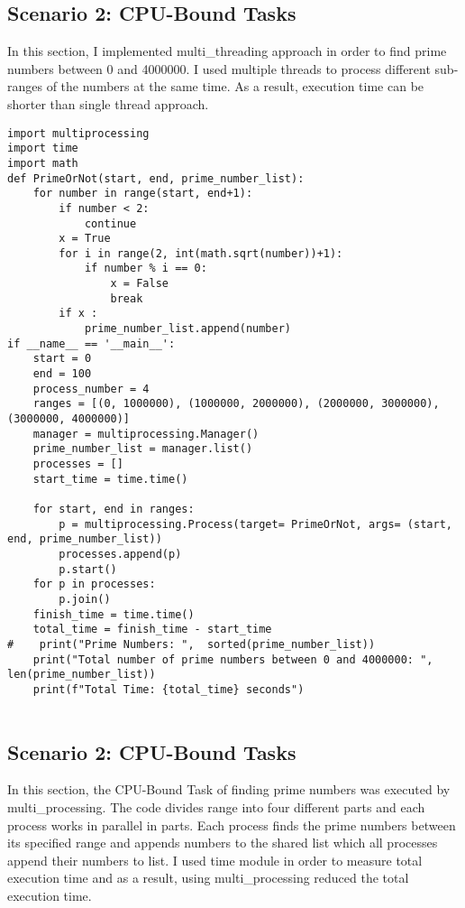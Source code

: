 \documentclass[onecolumn]{article}
\begin{document}
\subsection{Scenario 2: CPU-Bound Tasks}

In this section, I implemented multi\_threading approach in order to find prime numbers between 0 and 4000000. I used multiple threads to process different sub-ranges of the numbers at the same time. As a result, execution time can be shorter than single thread approach.  

\begin{verbatim}
import multiprocessing
import time
import math
def PrimeOrNot(start, end, prime_number_list):
    for number in range(start, end+1):
        if number < 2:
            continue
        x = True
        for i in range(2, int(math.sqrt(number))+1):
            if number % i == 0:
                x = False
                break
        if x :
            prime_number_list.append(number)
if __name__ == '__main__':
    start = 0
    end = 100
    process_number = 4
    ranges = [(0, 1000000), (1000000, 2000000), (2000000, 3000000), (3000000, 4000000)]
    manager = multiprocessing.Manager()
    prime_number_list = manager.list()
    processes = []
    start_time = time.time()

    for start, end in ranges:
        p = multiprocessing.Process(target= PrimeOrNot, args= (start, end, prime_number_list))
        processes.append(p)
        p.start()
    for p in processes:
        p.join()
    finish_time = time.time()
    total_time = finish_time - start_time
#    print("Prime Numbers: ",  sorted(prime_number_list))
    print("Total number of prime numbers between 0 and 4000000: ",  len(prime_number_list))
    print(f"Total Time: {total_time} seconds")


\end{verbatim}

\subsection{Scenario 2: CPU-Bound Tasks}
In this section, the CPU-Bound Task of finding prime numbers was executed by multi\_processing. The code divides range into four different parts and each process works in parallel in parts. Each process finds the prime numbers between its specified range and appends numbers to the shared list which all processes append their numbers to list. I used time module in order to measure total execution time and as a result, using multi\_processing reduced the total execution time.
\end{document}
